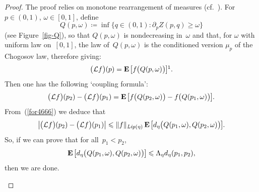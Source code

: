 \begingroup{}
\begin{proof}
The proof relies on monotone rearrangement of measures (cf.~\cite[p.~75]{Villani-topics}).
For~$p \in (0,1)$, $\omega \in [0,1]$, define
\[ Q(p,\omega) \coloneqq \inf\big\{ q\in(0,1) \colon \partial_p Z(p,q) \geq \omega \big\} \]
(see Figure~\ref{fig-Q}),
so that $Q(p,\omega)$ is nondecreasing in~$\omega$
and that, for $\omega$ with uniform law on~$[0,1]$,
the law of~$Q(p,\omega)$ is the conditioned version $\mu_p$ of the Chogosov law,
therefore giving:
\[ \big(\mathcal{L}f\big)(p) = \EE\big[f\big(Q(p,\omega)\big)\big] \footnotemark .\]
%
%
Then one has the following `coupling formula':
\[\label{for4666}
\big(\mathcal{L}f\big)(p_2) - \big(\mathcal{L}f\big)(p_1) = \EE\big[f\big(Q(p_2,\omega)\big) - f\big(Q(p_1,\omega)\big)\big] .\]
%
From~(\ref{for4666}) we deduce that
\[ \big| \big(\mathcal{L}f\big)(p_2) - \big(\mathcal{L}f\big)(p_1) \big|
\leq \|f\|_{\mathit{Lip}(\eta)} \EE\big[d_{\eta}\big(Q(p_1,\omega),Q(p_2,\omega)\big)\big] .\]
So, if we can prove that for all~$p_1<p_2$,
\[\label{for5207}
\EE\big[d_{\eta}\big(Q(p_1,\omega),Q(p_2,\omega)\big)\big] \leq \Lambda_{\eta} d_{\eta}(p_1,p_2) ,\]
then we are done.
%
\begin{figure}
\centering
%
\end{figure}
\end{proof}
